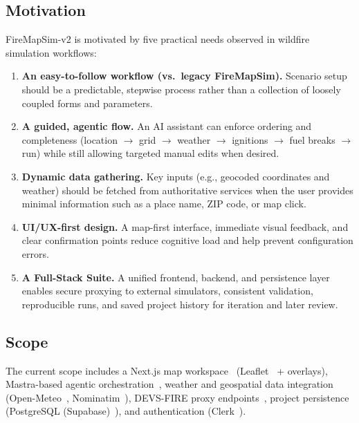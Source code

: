 \documentclass[12pt]{article}
\begin{document}
\subsection{Motivation}
FireMapSim-v2 is motivated by five practical needs observed in wildfire simulation workflows:
\begin{enumerate}
    \item \textbf{An easy-to-follow workflow (vs.\ legacy FireMapSim).} Scenario setup should be a
    predictable, stepwise process rather than a collection of loosely coupled forms and parameters.
    \item \textbf{A guided, agentic flow.} An AI assistant can enforce ordering and completeness
    (location $\rightarrow$ grid $\rightarrow$ weather $\rightarrow$ ignitions $\rightarrow$ fuel
    breaks $\rightarrow$ run) while still allowing targeted manual edits when desired.
    \item \textbf{Dynamic data gathering.} Key inputs (e.g., geocoded coordinates and weather)
    should be fetched from authoritative services when the user provides minimal information such
    as a place name, ZIP code, or map click.
    \item \textbf{UI/UX-first design.} A map-first interface, immediate visual feedback, and
    clear confirmation points reduce cognitive load and help prevent configuration errors.
    \item \textbf{A Full-Stack Suite.} A unified frontend, backend, and persistence layer enables
    secure proxying to external simulators, consistent validation, reproducible runs, and saved
    project history for iteration and later review.
\end{enumerate}

\subsection{Scope}
The current scope includes a Next.js map workspace~\cite{nextjs} (Leaflet~\cite{leaflet} +
overlays), Mastra-based agentic orchestration~\cite{mastra}, weather and geospatial data
integration (Open-Meteo~\cite{openmeteo}, Nominatim~\cite{nominatim}), DEVS-FIRE proxy
endpoints~\cite{devsfire}, project persistence (PostgreSQL (Supabase)~\cite{supabase}), and authentication
(Clerk~\cite{clerk}).

\end{document}
